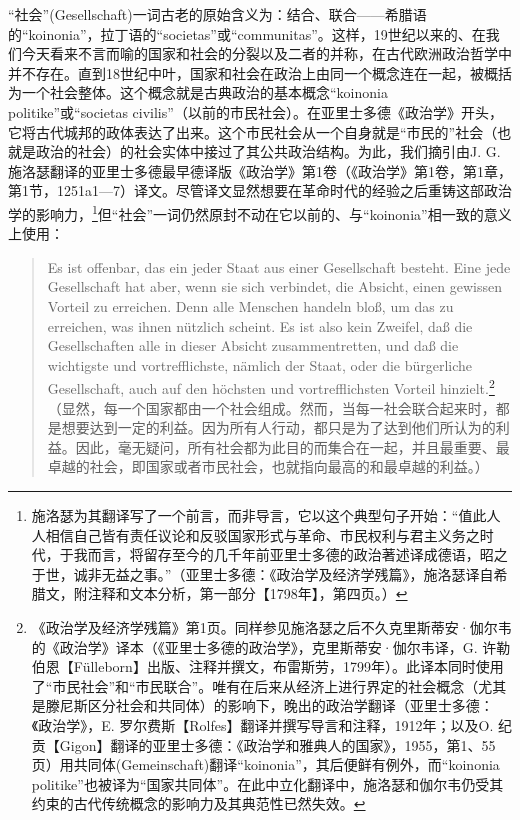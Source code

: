 “社会”(Gesellschaft)一词古老的原始含义为：结合、联合——希腊语的“koinonia”，拉丁语的“societas”或“communitas”。这样，19世纪以来的、在我们今天看来不言而喻的国家和社会的分裂以及二者的并称，在古代欧洲政治哲学中并不存在。直到18世纪中叶，国家和社会在政治上由同一个概念连在一起，被概括为一个社会整体。这个概念就是古典政治的基本概念“koinonia politike”或“societas civilis”（以前的市民社会）。在亚里士多德《政治学》开头，它将古代城邦的政体表达了出来。这个市民社会从一个自身就是“市民的”社会（也就是政治的社会）的社会实体中接过了其公共政治结构。为此，我们摘引由J. G. 施洛瑟翻译的亚里士多德最早德译版《政治学》第1卷（《政治学》第1卷，第1章，第1节，1251a1—7）译文。尽管译文显然想要在革命时代的经验之后重铸这部政治学的影响力，\footnote{施洛瑟为其翻译写了一个前言，而非导言，它以这个典型句子开始：“值此人人相信自己皆有责任议论和反驳国家形式与革命、市民权利与君主义务之时代，于我而言，将留存至今的几千年前亚里士多德的政治著述译成德语，昭之于世，诚非无益之事。”（亚里士多德：《政治学及经济学残篇》，施洛瑟译自希腊文，附注释和文本分析，第一部分【1798年】，第四页。）}但“社会”一词仍然原封不动在它以前的、与“koinonia”相一致的意义上使用：

\begin{quote}
Es ist offenbar, das ein jeder Staat aus einer Gesellschaft besteht. Eine jede Gesellschaft hat aber, wenn sie sich verbindet, die Absicht, einen gewissen Vorteil zu erreichen. Denn alle Menschen handeln bloß, um das zu erreichen, was ihnen nützlich scheint. Es ist also kein Zweifel, daß die Gesellschaften alle in dieser Absicht zusammentretten, und daß die wichtigste und vortrefflichste, nämlich der Staat, oder die bürgerliche Gesellschaft, auch auf den höchsten und vortrefflichsten Vorteil hinzielt.\footnote{《政治学及经济学残篇》第1页。同样参见施洛瑟之后不久克里斯蒂安·伽尔韦的《政治学》译本（《亚里士多德的政治学》，克里斯蒂安·伽尔韦译，G. 许勒伯恩【Fülleborn】出版、注释并撰文，布雷斯劳，1799年）。此译本同时使用了“市民社会”和“市民联合”。唯有在后来从经济上进行界定的社会概念（尤其是滕尼斯区分社会和共同体）的影响下，晚出的政治学翻译（亚里士多德：《政治学》，E. 罗尔费斯【Rolfes】翻译并撰写导言和注释，1912年；以及O. 纪贡【Gigon】翻译的亚里士多德：《政治学和雅典人的国家》，1955，第1、55页）用共同体(Gemeinschaft)翻译“koinonia”，其后便鲜有例外，而“koinonia politike”也被译为“国家共同体”。在此中立化翻译中，施洛瑟和伽尔韦仍受其约束的古代传统概念的影响力及其典范性已然失效。}（显然，每一个国家都由一个社会组成。然而，当每一社会联合起来时，都是想要达到一定的利益。因为所有人行动，都只是为了达到他们所认为的利益。因此，毫无疑问，所有社会都为此目的而集合在一起，并且最重要、最卓越的社会，即国家或者市民社会，也就指向最高的和最卓越的利益。）
\end{quote}

